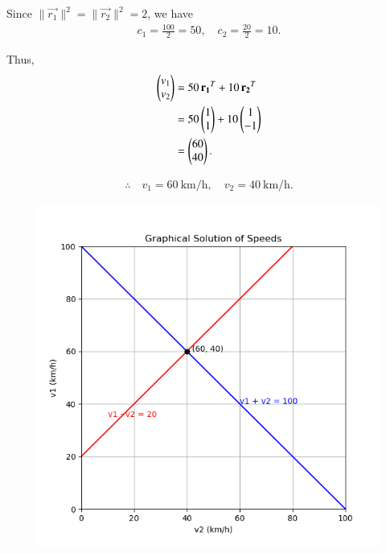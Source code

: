 \documentclass[journal]{IEEEtran}
\begin{document}
Since \(\|\vec{r_1}\|^2 = \|\vec{r_2}\|^2 = 2\), we have
\begin{align}
c_1 = \frac{100}{2} = 50, \quad c_2 = \frac{20}{2} = 10.
\end{align}

Thus,
\begin{align}
\begin{pmatrix}v_1 \\ v_2\end{pmatrix} &= 50\,\mathbf{r_1}^{T} + 10\,\mathbf{r_2}^{T} \\
&= 50\begin{pmatrix}1 \\ 1\end{pmatrix} + 10\begin{pmatrix}1 \\ -1\end{pmatrix} \\
&= \begin{pmatrix}60 \\ 40\end{pmatrix}.
\end{align}

\begin{align}
\therefore \quad v_1 = 60~\text{km/h}, \quad v_2 = 40~\text{km/h}.
\end{align}

\begin{figure}[ht!]
\centering
\includegraphics[height=0.6\textheight, keepaspectratio]{figs/speed.png}
\end{figure}
\end{document}
